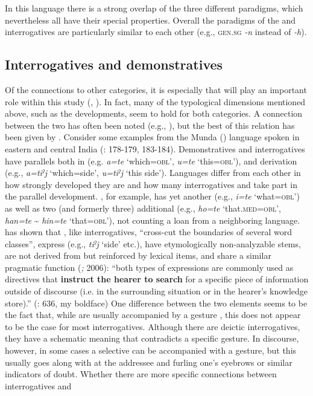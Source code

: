 In this language there is a strong overlap of the three different paradigms, which nevertheless all have their special properties. Overall the paradigms of the  and interrogatives are particularly similar to each other (e.g., \textsc{gen.sg} \textit{-n} instead of \textit{-h}).

\subsection{Interrogatives and demonstratives}\label{sec:4.3.5}

Of the connections to other categories, it is especially  that will play an important role within this study (, ). In fact, many of the typological dimensions mentioned above, such as the  developments, seem to hold for both categories. A connection between the two has often been noted (e.g., \citealt{Dixon2012}), but the best  of this relation has been given by \citet{Diessel2003}. Consider some examples from the Munda () language  spoken in eastern and central India (\citealt{Peterson2011}: 178-179, 183-184). Demonstratives and interrogatives have parallels both in  (e.g. \textit{a=te} ‘which=\textsc{obl}’, \textit{u=te} ‘this=\textsc{obl}’), and derivation (e.g., \textit{a=tiˀj} ‘which=side’, \textit{u=tiˀj} ‘this side’). Languages differ from each other in how strongly developed they are and how many interrogatives and  take part in the parallel development. , for example, has yet another  (e.g., \textit{i=te} ‘what=\textsc{obl}’) as well as two (and formerly three) additional  (e.g., \textit{ho=te} ‘that.\textsc{med=obl}’, \textit{han=te} {\textasciitilde} \textit{hin=te} ‘that=\textsc{obl}’), not counting a loan from a neighboring language. \citet[635]{Diessel2003} has shown that , like interrogatives, “cross-cut the boundaries of several word classes”, express  (e.g.,  \textit{tiˀj} ‘side’ etc.), have etymologically non-analyzable stems, are not derived from but reinforced by lexical items, and share a similar pragmatic function (\citealt{Diessel2003}\emph{\textup{;}} 2006): “both types of expressions are commonly used as directives that \textbf{instruct the hearer to search} for a specific piece of information outside of discourse (i.e. in the surrounding situation or in the hearer’s knowledge store).” (\citealt{Diessel2003}: 636, my boldface) One difference between the two elements seems to be the fact that, while  are usually accompanied by a  gesture \citep{Diessel2006}, this does not appear to be the case for most interrogatives. Although there are deictic interrogatives, they have a schematic meaning that contradicts a specific  gesture. In  discourse, however, in some cases a selective  can be accompanied with a  gesture, but this usually goes along with  at the addressee and furling one’s eyebrows or similar indicators of doubt. Whether there are more specific connections between interrogatives and 